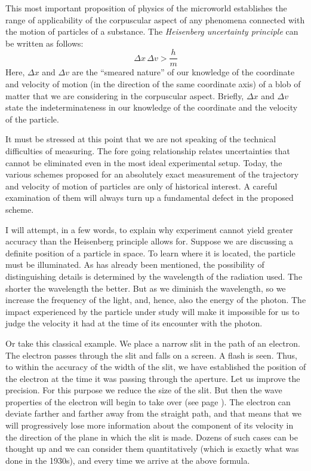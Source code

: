This most important proposition of physics of the mi­croworld establishes the range of applicability of the corpuscular aspect of any phenomena connected with the motion of particles of a substance. The \emph{Heisenberg uncer­tainty principle} can be written as follows:
\begin{equation*}%
\Delta x \, \Delta v >  \frac{h}{m}
\end{equation*}
Here, $\Delta x$ and $\Delta v$ are the ``smeared nature'' of our knowl­edge of the coordinate and velocity of motion (in the direction of the same coordinate axis) of a blob of matter that we are considering in the corpuscular aspect. Briefly, $\Delta x$ and $\Delta v$ state the indeterminateness in our knowledge of the coordinate and the velocity of the par­ticle.

It must be stressed at this point that we are not speaking of the technical difficulties of measuring. The fore­ going relationship relates uncertainties that cannot be eliminated even in the most ideal experimental setup. Today, the various schemes proposed for an absolutely exact measurement of the trajectory and velocity of mo­tion of particles are only of historical interest. A careful examination of them will always turn up a fundamental defect in the proposed scheme.

I will attempt, in a few words, to explain why experi­ment cannot yield greater accuracy than the Heisenberg principle allows for. Suppose we are discussing a definite position of a particle in space. To learn where it is locat­ed, the particle must be illuminated. As has already been mentioned, the possibility of distinguishing details is determined by the wavelength of the radiation used. The shorter the wavelength the better. But as we dimin­ish the wavelength, so we increase the frequency of the light, and, hence, also the energy of the photon. The impact experienced by the particle under study will make it impossible for us to judge the velocity it had at the time of its encounter with the photon.

Or take this classical example. We place a narrow slit in the path of an electron. The electron passes through the slit and falls on a screen. A flash is seen. Thus, to within the accuracy of the width of the slit, we have established the position of the electron at the time it was passing through the aperture. Let us improve the precision. For this purpose we reduce the size of the slit. But then the wave properties of the electron will begin to take over (see page \pageref{diff-ref}). The electron can deviate farther and farther away from the straight path, and that means that we will progressively lose more information about the component of its velocity in the direction of the plane in which the slit is made. Dozens of such cases can be thought up and we can consider them quantitatively (which is exactly what was done in the 1930s), and every time we arrive at the above formula.

